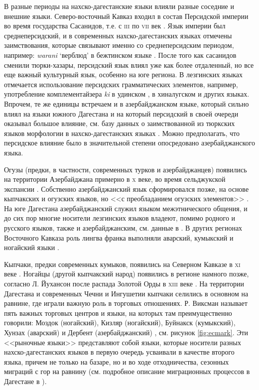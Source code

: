 \par В разные периоды на нахско-дагестанские языки влияли разные соседние и внешние языки. Северо-восточный Кавказ входил в состав Персидской империи во время государства Сасанидов, т.е. с \textsc{iii} по \textsc{vii} век \citep[121]{ataevetal1967}. Язык империи был среднеперсидский, и в современных нахско-дагестанских языках отмечены заимствования, которые связывают именно со среднеперсидским периодом, например: \textit{warani} `верблюд' в бежтинском языке \citep{wold15}. После того как сасанидов сменили тюрки-хазары, персидский язык влиял уже как более отдаленный, но все еще важный культурный язык, особенно на юге региона. В лезгинских языках отмечается использование персидских грамматических элементов, например, употребление комплементайзера \textit{ki} в удинском \citep{lander2014}, в хиналугском \citep{daniel2013} и других языках. Впрочем, те же единицы встречаем и в азербайджанском языке, который сильно влиял на языки южного Дагестана и на который персидский в своей очереди оказывал большое влияние, см. базу данных о заимствованной из тюркских языков морфологии в нахско-дагестанских языках \citep{aristova}. Можно предполагать, что персидское влияние было в значительной степени опосредовано азербайджанского языка. 
\par Огузы (предки, в частности, современных турков и азербайджанцев) появились на территории Азербайджана примерно в \textsc{x} веке, во время сельджукской экспансии \citep[162--166]{johanson2006}. Собственно азербайджанский язык сформировался позже, на основе кыпчакских и огузских языков, но <<с преобладанием огузских элементов>> \citep[78]{shiraliev1958}. На юге Дагестана азербайджанский служил языком межэтнического общения, и до сих пор многие носители лезгинских языков владеют, помимо родного и русского языков, также и азербайджанским, см. данные в \citep{multidag}. В других регионах Восточного Кавказа роль лингва франка выполняли аварский, кумыкский и ногайский языки \citep[72--74]{chirikba2008}. 
\par Кыпчаки, предки современных кумыков, появились на Северном Кавказе в \textsc{xi} веке \citep[148]{piotrovksij1988}. Ногайцы (другой кыпчакский народ) появились в регионе намного позже, согласно Л. Йухансон после распада Золотой Орды в \textsc{xiii} веке \citep[162--166]{johanson2006}. На территории Дагестана и современных Чечни и Ингушетии кыпчаки селились в основном на равнине, где играли важную роль в торговых отношениях. Р. Виксман называет пять важных торговых центров и языки, на которых там преимущественно говорили: Моздок (ногайский), Кизляр (ногайский), Буйнакск (кумыкский), Хунзах (аварский) и Дербент (азербайджанский) \citep[58--59]{wixman1980}, см. рисунок \ref{fig:ecmark}. Эти <<рыночные языки>> представляют собой языки, которые носители разных нахско-дагестанских языков в первую очередь усваивали в качестве второго языка, причем не только на базаре, но и во ходе отходничества, сезонных миграций с гор на равнину (см. подробное описание миграционных процессов в Дагестане в \citep[30--39]{karpovkapustina2011}).

